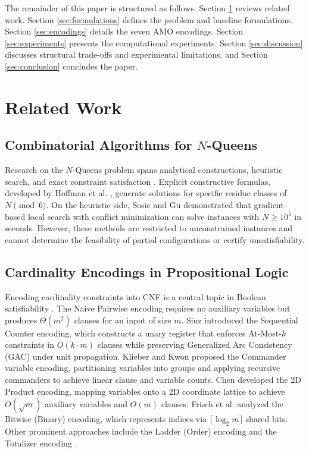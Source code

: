 \documentclass[a4paper,fleqn]{cas-sc}
\begin{document}
The remainder of this paper is structured as follows. Section \ref{sec:related} reviews related work. Section \ref{sec:formulations} defines the problem and baseline formulations. Section \ref{sec:encodings} details the seven AMO encodings. Section \ref{sec:experiments} presents the computational experiments. Section \ref{sec:discussion} discusses structural trade-offs and experimental limitations, and Section \ref{sec:conclusion} concludes the paper.

\section{Related Work}
\label{sec:related}

\subsection{Combinatorial Algorithms for $N$-Queens}
Research on the $N$-Queens problem spans analytical constructions, heuristic search, and exact constraint satisfaction \citep{bell2009survey}. Explicit constructive formulas, developed by Hoffman et al. \citep{hoffman1969constructions}, generate solutions for specific residue classes of $N \pmod 6$. On the heuristic side, Sosic and Gu \citep{sosic1994efficient} demonstrated that gradient-based local search with conflict minimization can solve instances with $N \ge 10^5$ in seconds. However, these methods are restricted to unconstrained instances and cannot determine the feasibility of partial configurations or certify unsatisfiability.

\subsection{Cardinality Encodings in Propositional Logic}
Encoding cardinality constraints into CNF is a central topic in Boolean satisfiability \citep{biere2021handbook, prestwich2009cnf}. The Naive Pairwise encoding requires no auxiliary variables but produces $\Theta(m^2)$ clauses for an input of size $m$. Sinz \citep{sinz2005towards} introduced the Sequential Counter encoding, which constructs a unary register that enforces At-Most-$k$ constraints in $O(k \cdot m)$ clauses while preserving Generalized Arc Consistency (GAC) under unit propagation. Klieber and Kwon \citep{klieber2007commander} proposed the Commander variable encoding, partitioning variables into groups and applying recursive commanders to achieve linear clause and variable counts. Chen \citep{chen2010product} developed the 2D Product encoding, mapping variables onto a 2D coordinate lattice to achieve $O(\sqrt{m})$ auxiliary variables and $O(m)$ clauses. Frisch et al. \citep{frisch2005symmetry} analyzed the Bitwise (Binary) encoding, which represents indices via $\lceil \log_2 m \rceil$ shared bits. Other prominent approaches include the Ladder (Order) encoding \citep{gent2004ladder} and the Totalizer encoding \citep{bailleux2003totalizer}.
\end{document}
